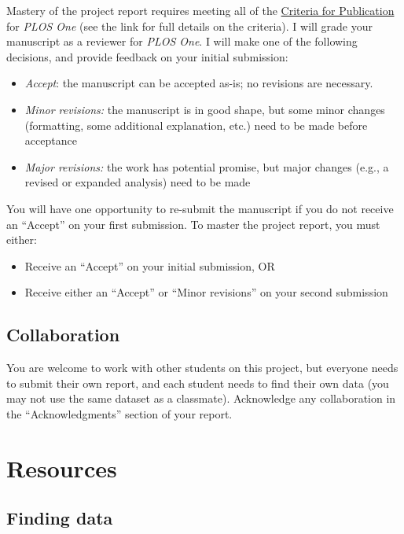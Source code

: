 \documentclass[11pt]{article}
\begin{document}
\noindent Mastery of the project report requires meeting all of the \href{https://journals.plos.org/plosone/s/journal-information#loc-criteria-for-publication}{Criteria for Publication} for \textit{PLOS One} (see the link for full details on the criteria). I will grade your manuscript as a reviewer for \textit{PLOS One}. I will make one of the following decisions, and provide feedback on your initial submission:
\begin{itemize}
\item \textit{Accept}: the manuscript can be accepted as-is; no revisions are necessary.

\item \textit{Minor revisions:} the manuscript is in good shape, but some minor changes (formatting, some additional explanation, etc.) need to be made before acceptance

\item \textit{Major revisions:} the work has potential promise, but major changes (e.g., a revised or expanded analysis) need to be made
\end{itemize}

\noindent You will have one opportunity to re-submit the manuscript if you do not receive an ``Accept'' on your first submission. To master the project report, you must either:
\begin{itemize}
\item Receive an ``Accept'' on your initial submission, OR
\item Receive either an ``Accept'' or ``Minor revisions'' on your second submission
\end{itemize}

\subsection*{Collaboration}

You are welcome to work with other students on this project, but everyone needs to submit their own report, and each student needs to find their own data (you may not use the same dataset as a classmate). Acknowledge any collaboration in the ``Acknowledgments'' section of your report.

\section*{Resources}

\subsection*{Finding data}
\end{document}
